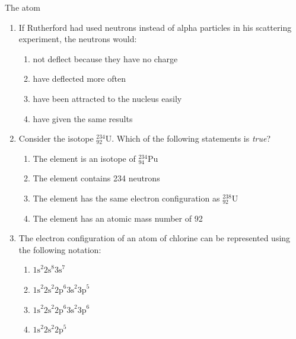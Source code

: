 \begin{eocexercises}{The atom}
\begin{enumerate}[noitemsep, label=\textbf{\arabic*}. ]
\label{m38741*id263355}\begin{enumerate}[noitemsep, label=\textbf{\alph*}. ] 
            \label{m38741*uid204}\item positive
\label{m38741*uid205}\item neutral
\label{m38741*uid206}\item negative
\item none of the above
\end{enumerate}
                \label{m38741*uid207}\item If Rutherford had used neutrons instead of alpha particles in his scattering experiment, the neutrons would:
\label{m38741*id263410}\begin{enumerate}[noitemsep, label=\textbf{\alph*}. ] 
            \label{m38741*uid208}\item not deflect because they have no charge
\label{m38741*uid209}\item have deflected more often
\label{m38741*uid210}\item have been attracted to the nucleus easily
\label{m38741*uid211}\item have given the same results
\end{enumerate}
                \label{m38741*uid212}\item Consider the isotope $_{92}^{234}\text{U}$. Which of the following statements is \textsl{true}?
\label{m38741*id263500}\begin{enumerate}[noitemsep, label=\textbf{\alph*}. ]
            \label{m38741*uid213}\item The element is an isotope of $_{94}^{234}\text{Pu}$
\label{m38741*uid214}\item The element contains 234 neutrons
\label{m38741*uid215}\item The element has the same electron configuration as $_{92}^{238}\text{U}$
\label{m38741*uid216}\item The element has an atomic mass number of 92
\end{enumerate}
                \label{m38741*uid217}\item The electron configuration of an atom of chlorine can be represented using the following notation:
\label{m38741*id263598}\begin{enumerate}[noitemsep, label=\textbf{\alph*}. ] 
            \label{m38741*uid218}\item  ${1\text{s}}^{2}{2\text{s}}^{8}{3\text{s}}^{7}$\label{m38741*uid219}\item 
${1\text{s}}^{2}{2\text{s}}^{2}{2\text{p}}^{6}{3\text{s}}^{2}{3\text{p}}^{5}$
\label{m38741*uid220}\item 
${1\text{s}}^{2}{2\text{s}}^{2}{2\text{p}}^{6}{3\text{s}}^{2}{3\text{p}}^{6}$\label{m38741*uid221}\item 
${1\text{s}}^{2}{2\text{s}}^{2}{2\text{p}}^{5}$\end{enumerate}


\end{enumerate}
\end{eocexercises}
